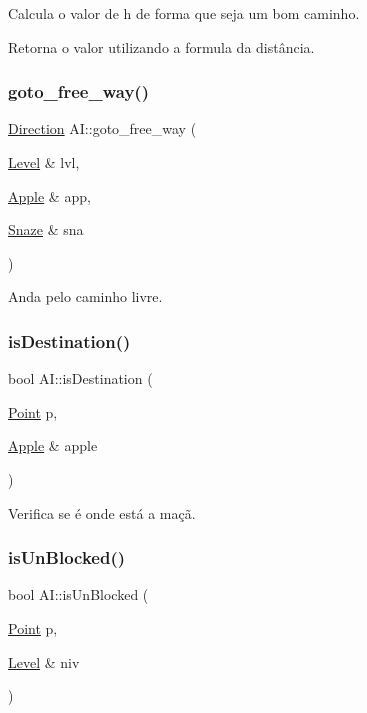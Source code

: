 Calcula o valor de \textquotesingle{}h\textquotesingle{} de forma que seja um bom caminho. 

Retorna o valor utilizando a formula da distância. \mbox{\label{classAI_ab74866f1d674f96d1a7ae37b6b677982}} 
\subsubsection{\texorpdfstring{goto\+\_\+free\+\_\+way()}{goto\_free\_way()}}
{\footnotesize\ttfamily \hyperlink{game__classes_8hpp_a224b9163917ac32fc95a60d8c1eec3aa}{Direction} A\+I\+::goto\+\_\+free\+\_\+way (\begin{DoxyParamCaption}\item[{\hyperlink{classLevel}{Level} \&}]{lvl,  }\item[{\hyperlink{classApple}{Apple} \&}]{app,  }\item[{\hyperlink{classSnaze}{Snaze} \&}]{sna }\end{DoxyParamCaption})}



Anda pelo caminho livre. 

\mbox{\label{classAI_a6b37ac577106682d3e8aa9a19b9ca9cc}} 
\subsubsection{\texorpdfstring{is\+Destination()}{isDestination()}}
{\footnotesize\ttfamily bool A\+I\+::is\+Destination (\begin{DoxyParamCaption}\item[{\hyperlink{structPoint}{Point}}]{p,  }\item[{\hyperlink{classApple}{Apple} \&}]{apple }\end{DoxyParamCaption})\hspace{0.3cm}{\ttfamily [private]}}



Verifica se é onde está a maçã. 

\mbox{\label{classAI_a5585946408be2dfe1111aa2bfc8b6869}} 
\subsubsection{\texorpdfstring{is\+Un\+Blocked()}{isUnBlocked()}}
{\footnotesize\ttfamily bool A\+I\+::is\+Un\+Blocked (\begin{DoxyParamCaption}\item[{\hyperlink{structPoint}{Point}}]{p,  }\item[{\hyperlink{classLevel}{Level} \&}]{niv }\end{DoxyParamCaption})\hspace{0.3cm}{\ttfamily [private]}}



